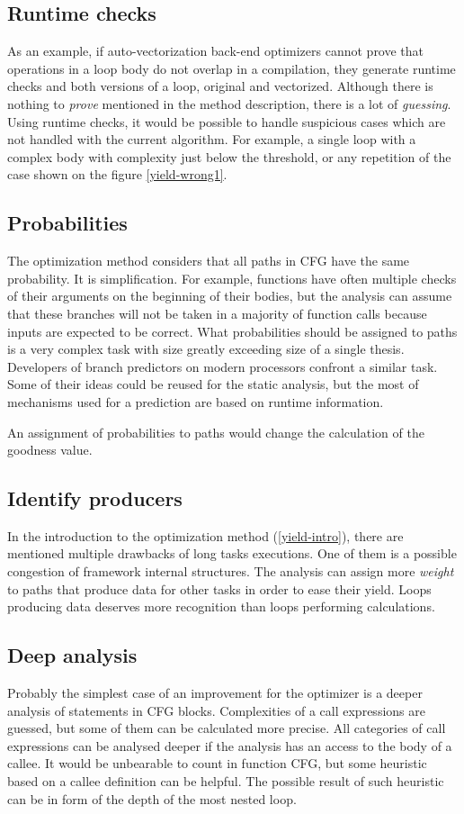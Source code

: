 \subsection{Runtime checks}
As an example, if auto-vectorization back-end optimizers cannot prove that operations in a loop body do not overlap in a compilation, they generate runtime checks and both versions of a loop, original and vectorized. Although there is nothing to \emph{prove} mentioned in the method description, there is a lot of \emph{guessing}. Using runtime checks, it would be possible to handle suspicious cases which are not handled with the current algorithm. For example, a single loop with a complex body with complexity just below the threshold, or any repetition of the case shown on the figure \ref{yield-wrong1}.

\subsection{Probabilities}
The optimization method considers that all paths in CFG have the same probability. It is simplification. For example, functions have often multiple checks of their arguments on the beginning of their bodies, but the analysis can assume that these branches will not be taken in a majority of function calls because inputs are expected to be correct. What probabilities should be assigned to paths is a very complex task with size greatly exceeding size of a single thesis. Developers of branch predictors on modern processors confront a similar task. Some of their ideas could be reused for the static analysis, but the most of mechanisms used for a prediction are based on runtime information.

An assignment of probabilities to paths would change the calculation of the goodness value.

\subsection{Identify producers}
In the introduction to the optimization method (\ref{yield-intro}), there are mentioned multiple drawbacks of long tasks executions. One of them is a possible congestion of framework internal structures. The analysis can assign more \emph{weight} to paths that produce data for other tasks in order to ease their yield. Loops producing data deserves more recognition than loops performing calculations.

\subsection{Deep analysis}
Probably the simplest case of an improvement for the optimizer is a deeper analysis of statements in CFG blocks. Complexities of a call expressions are guessed, but some of them can be calculated more precise. All categories of call expressions can be analysed deeper if the analysis has an access to the body of a callee. It would be unbearable to count in function CFG, but some heuristic based on a callee definition can be helpful. The possible result of such heuristic can be in form of the depth of the most nested loop.

